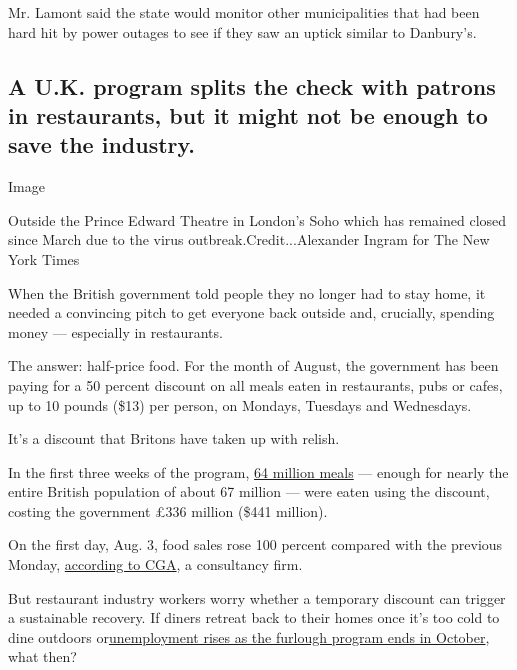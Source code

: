 Mr. Lamont said the state would monitor other municipalities that had
been hard hit by power outages to see if they saw an uptick similar to
Danbury's.

\hypertarget{a-uk-program-splits-the-check-with-patrons-in-restaurants-but-it-might-not-be-enough-to-save-the-industry}{%
\subsection{A U.K. program splits the check with patrons in restaurants,
but it might not be enough to save the
industry.}\label{a-uk-program-splits-the-check-with-patrons-in-restaurants-but-it-might-not-be-enough-to-save-the-industry}}

Image

Outside the Prince Edward Theatre in London's Soho which has remained
closed since March due to the virus outbreak.Credit...Alexander Ingram
for The New York Times

When the British government told people they no longer had to stay home,
it needed a convincing pitch to get everyone back outside and,
crucially, spending money --- especially in restaurants.

The answer: half-price food. For the month of August, the government has
been paying for a 50 percent discount on all meals eaten in restaurants,
pubs or cafes, up to 10 pounds (\$13) per person, on Mondays, Tuesdays
and Wednesdays.

It's a discount that Britons have taken up with relish.

In the first three weeks of the program,
\href{https://www.gov.uk/government/news/over-64-million-meals-claimed-for-as-eat-out-to-help-out-enters-fourth-week}{64
million meals} --- enough for nearly the entire British population of
about 67 million --- were eaten using the discount, costing the
government £336 million (\$441 million).

On the first day, Aug. 3, food sales rose 100 percent compared with the
previous Monday,
\href{https://www.cga.co.uk/2020/08/14/eat-out-to-help-out-helps-food-sales-surge-by-a-third-week-on-week/}{according
to CGA}, a consultancy firm.

But restaurant industry workers worry whether a temporary discount can
trigger a sustainable recovery. If diners retreat back to their homes
once it's too cold to dine outdoors
or\href{https://www.nytimes3xbfgragh.onion/2020/07/10/business/economy/britain-jobs-plan-layoffs.html}{unemployment
rises as the furlough program ends in October}, what then?

